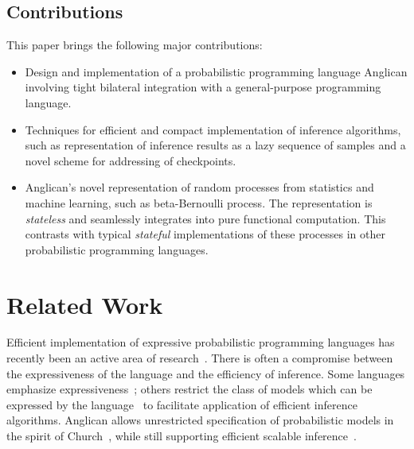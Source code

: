 \documentclass[preprint]{sigplanconf}
\begin{document}
\subsection*{Contributions} This paper brings the following
major contributions:
\begin{itemize}
    \item Design and implementation of a probabilistic programming language
        Anglican involving tight bilateral integration with a general-purpose
        programming language.
    \item Techniques for efficient and compact implementation of inference
        algorithms, such as representation of inference results as a lazy
        sequence of samples and a novel scheme for addressing of checkpoints.
    \item Anglican's novel representation of random processes 
            from statistics and machine learning, such as beta-Bernoulli
            process. The representation is
            \emph{stateless} and seamlessly integrates into pure functional 
            computation. This contrasts with typical \emph{stateful}
            implementations of these processes in other probabilistic 
            programming languages.
\end{itemize}

\section{Related Work} \label{sec:related}

Efficient implementation of expressive probabilistic programming
languages has recently been an active area of
research~\cite{MMR+07,GMR+08,P09,MWG+10,MSP14,
SDT14,WVM14,GS15,GSX+16}. There is often a compromise between
the expressiveness of the language and the efficiency of
inference.  Some languages emphasize
expressiveness~\cite{MMR+07,GMR+08,MSP14,GS15}; others restrict
the class of models which can be expressed by the
language~\cite{MWG+10,SDT14,NN14} to facilitate application of
efficient inference algorithms. Anglican allows unrestricted
specification of probabilistic models in the spirit of
Church~\cite{GMR+08}, while still supporting efficient scalable
inference~\cite{WVM14,PWD+14,RNL+2016}.
\end{document}
